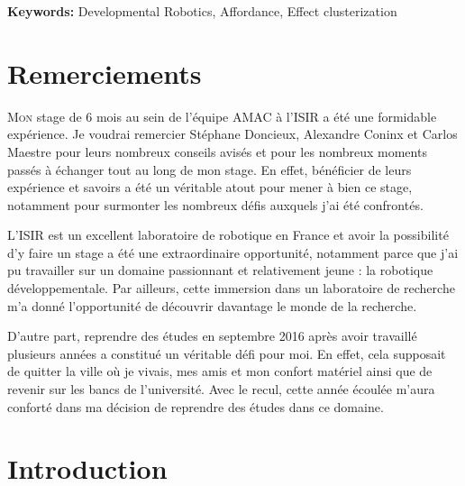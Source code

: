 \documentclass{llncs}
\begin{document}
\textbf{Keywords:} Developmental Robotics, Affordance, Effect clusterization




\section*{Remerciements}

\lettrine{M}{on} stage de 6 mois au sein de l'équipe AMAC à l'ISIR a été une formidable expérience.
Je voudrai remercier Stéphane Doncieux, Alexandre Coninx et Carlos Maestre pour leurs nombreux conseils avisés et pour les nombreux moments passés à échanger tout au long de mon stage.
En effet, bénéficier de leurs expérience et savoirs a été un véritable atout pour mener à bien ce stage, notamment pour surmonter les nombreux défis auxquels j'ai été confrontés.

L'ISIR est un excellent laboratoire de robotique en France et avoir la possibilité d'y faire un stage a été une extraordinaire opportunité, notamment parce que j'ai pu travailler sur un domaine passionnant et relativement jeune : la robotique développementale.
Par ailleurs, cette immersion dans un laboratoire de recherche m'a donné l'opportunité de découvrir davantage le monde de la recherche.

D'autre part, reprendre des études en septembre 2016 après avoir travaillé plusieurs années a constitué un véritable défi pour moi.
En effet, cela supposait de quitter la ville où je vivais, mes amis et mon confort matériel ainsi que de revenir sur les bancs de l'université.
Avec le recul, cette année écoulée m'aura conforté dans ma décision de reprendre des études dans ce domaine.


\newpage

\section{Introduction}



\end{document}
